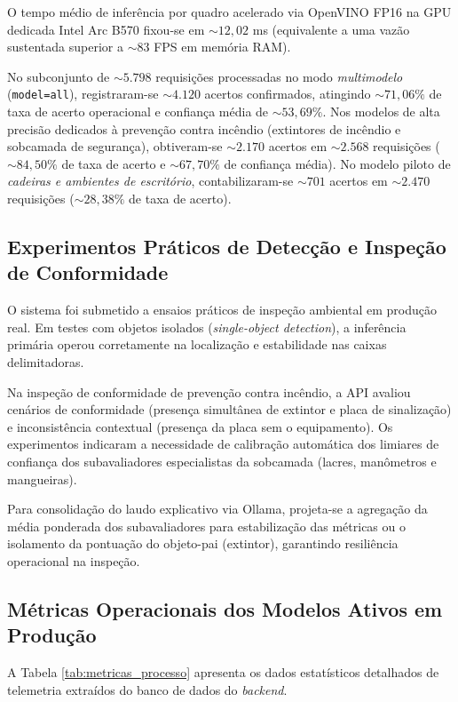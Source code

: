 \documentclass[a4paper,11pt]{article}
\begin{document}
O tempo médio de inferência por quadro acelerado via OpenVINO FP16 na GPU dedicada Intel Arc B570 fixou-se em $\sim 12{,}02$ ms (equivalente a uma vazão sustentada superior a $\sim 83$ FPS em memória RAM).

No subconjunto de $\sim 5.798$ requisições processadas no modo \textit{multimodelo} (\texttt{model=all}), registraram-se $\sim 4.120$ acertos confirmados, atingindo $\sim 71{,}06\%$ de taxa de acerto operacional e confiança média de $\sim 53{,}69\%$. Nos modelos de alta precisão dedicados à prevenção contra incêndio (extintores de incêndio e sobcamada de segurança), obtiveram-se $\sim 2.170$ acertos em $\sim 2.568$ requisições ($\sim 84{,}50\%$ de taxa de acerto e $\sim 67{,}70\%$ de confiança média). No modelo piloto de \textit{cadeiras e ambientes de escritório}, contabilizaram-se $\sim 701$ acertos em $\sim 2.470$ requisições ($\sim 28{,}38\%$ de taxa de acerto).

\subsection*{Experimentos Práticos de Detecção e Inspeção de Conformidade}
O sistema foi submetido a ensaios práticos de inspeção ambiental em produção real. Em testes com objetos isolados (\textit{single-object detection}), a inferência primária operou corretamente na localização e estabilidade nas caixas delimitadoras.

Na inspeção de conformidade de prevenção contra incêndio, a API avaliou cenários de conformidade (presença simultânea de extintor e placa de sinalização) e inconsistência contextual (presença da placa sem o equipamento). Os experimentos indicaram a necessidade de calibração automática dos limiares de confiança dos subavaliadores especialistas da sobcamada (lacres, manômetros e mangueiras).

Para consolidação do laudo explicativo via Ollama, projeta-se a agregação da média ponderada dos subavaliadores para estabilização das métricas ou o isolamento da pontuação do objeto-pai (extintor), garantindo resiliência operacional na inspeção.

\subsection*{Métricas Operacionais dos Modelos Ativos em Produção}
A Tabela \ref{tab:metricas_processo} apresenta os dados estatísticos detalhados de telemetria extraídos do banco de dados do \textit{backend}.
\end{document}
